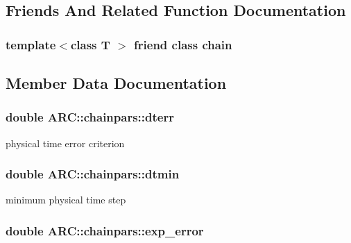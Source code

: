 \subsection{Friends And Related Function Documentation}
\subsubsection[{\texorpdfstring{chain}{chain}}]{\setlength{\rightskip}{0pt plus 5cm}template$<$class T $>$ friend class {\bf chain}\hspace{0.3cm}{\ttfamily [friend]}}\hypertarget{classARC_1_1chainpars_a498fbb4337b9878a5f0044996e4a2489}{}\label{classARC_1_1chainpars_a498fbb4337b9878a5f0044996e4a2489}


\subsection{Member Data Documentation}
\subsubsection[{\texorpdfstring{dterr}{dterr}}]{\setlength{\rightskip}{0pt plus 5cm}double A\+R\+C\+::chainpars\+::dterr}\hypertarget{classARC_1_1chainpars_ad3a3e8f9199180ec82b9c257b1e8570e}{}\label{classARC_1_1chainpars_ad3a3e8f9199180ec82b9c257b1e8570e}


physical time error criterion 

\subsubsection[{\texorpdfstring{dtmin}{dtmin}}]{\setlength{\rightskip}{0pt plus 5cm}double A\+R\+C\+::chainpars\+::dtmin}\hypertarget{classARC_1_1chainpars_ac414014d19915aecb35245ba11649c2e}{}\label{classARC_1_1chainpars_ac414014d19915aecb35245ba11649c2e}


minimum physical time step 

\subsubsection[{\texorpdfstring{exp\+\_\+error}{exp_error}}]{\setlength{\rightskip}{0pt plus 5cm}double A\+R\+C\+::chainpars\+::exp\+\_\+error}\hypertarget{classARC_1_1chainpars_a7ee477ebe8b1d67457891ab58560c074}{}\label{classARC_1_1chainpars_a7ee477ebe8b1d67457891ab58560c074}


